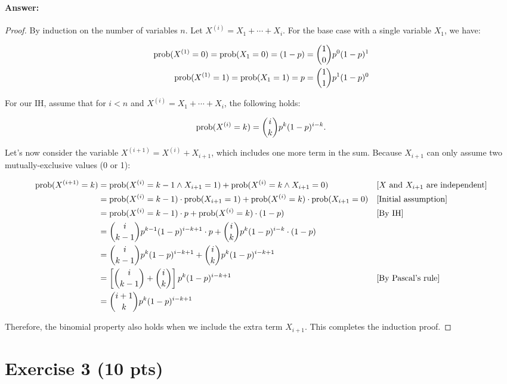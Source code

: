 \documentclass[a4paper]{article}
\begin{document}
\paragraph{Answer:}

\begin{proof}
By induction on the number of variables $n$. Let $X^{(i)} = X_1 + \cdots + X_i$. For the base case with a single variable $X_1$, we have:

\begin{align*}
\operatorname{prob}(X^{(1)} = 0) = \operatorname{prob}(X_1 = 0) = (1 - p) = {1 \choose 0} p^0 (1-p)^{1} \\
\operatorname{prob}(X^{(1)} = 1) = \operatorname{prob}(X_1 = 1) = p = {1 \choose 1} p^1 (1-p)^{0}
\end{align*}

For our IH, assume that for $i<n$ and $X^{(i)} = X_1 + \cdots + X_i$, the following holds:

$$\operatorname{prob}(X^{(i)} = k) = {i \choose k} p^k (1-p)^{i-k}.$$

Let's now consider the variable $X^{(i+1)} = X^{(i)} + X_{i+1}$, which includes one more term in the sum. Because $X_{i+1}$ can only assume two mutually-exclusive values (0 or 1):

\begin{align*}
\operatorname{prob}(X^{(i+1)} = k) & = \operatorname{prob}(X^{(i)} = k-1 \wedge X_{i+1} = 1) + \operatorname{prob}(X^{(i)} = k \wedge X_{i+1} = 0) && \text{[$X$ and $X_{i+1}$ are independent]}\\
& = \operatorname{prob}(X^{(i)} = k-1) \cdot \operatorname{prob}(X_{i+1} = 1) + \operatorname{prob}(X^{(i)} = k) \cdot \operatorname{prob}(X_{i+1} = 0) && \text{[Initial assumption]} \\
& = \operatorname{prob}(X^{(i)} = k-1) \cdot p + \operatorname{prob}(X^{(i)} = k) \cdot (1 - p) && \text{[By IH]}\\
& = {i \choose k-1} p^{k-1} (1-p)^{i-k+1} \cdot p + {i \choose k} p^k (1-p)^{i-k} \cdot (1 - p)\\
& = {i \choose k-1} p^{k} (1-p)^{i-k+1} + {i \choose k} p^k (1-p)^{i-k+1} \\
& = \left [ {i \choose k-1} + {i \choose k} \right] p^{k} (1-p)^{i-k+1}
&& \text{[By Pascal's rule]} \\
& =  {{i+1} \choose k} p^{k} (1-p)^{i-k+1}
\end{align*}

Therefore, the binomial property also holds when we include the extra term $X_{i+1}$. This completes the induction proof.
\end{proof}


\section{Exercise 3 (10 pts)}
\end{document}
